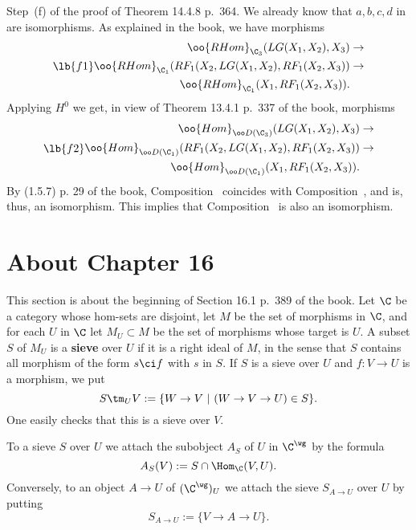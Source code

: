 \documentclass[12pt]{article}
\theoremstyle{remark}
\theoremstyle{definition}
\begin{document}
\begin{s}
Step~(f) of the proof of Theorem 14.4.8 p.~364. We already know that $a,b,c,d$ in  are isomorphisms. As explained in the book, we have morphisms  
\begin{equation}\lb{f1}
\begin{split}
\oo{RHom}_{\C_3}(LG(X_1,X_2),X_3)&\to\\ 
\oo{RHom}_{\C_1}(RF_1(X_2,LG(X_1,X_2),RF_1(X_2,X_3))&\to\\ 
\oo{RHom}_{\C_1}(X_1,RF_1(X_2,X_3)).
\end{split}
\end{equation}
Applying $H^0$ we get, in view of Theorem 13.4.1 p.~337 of the book, morphisms 
\begin{equation}\lb{f2}
\begin{split}
\oo{Hom}_{\oo D(\C_3)}(LG(X_1,X_2),X_3)&\to\\ 
\oo{Hom}_{\oo D(\C_1)}(RF_1(X_2,LG(X_1,X_2),RF_1(X_2,X_3))&\to\\ 
\oo{Hom}_{\oo D(\C_1)}(X_1,RF_1(X_2,X_3)).
\end{split}
\end{equation}
By (1.5.7) p. 29 of the book, Composition~ coincides with Composition~, and is, thus, an isomorphism. This implies that Composition~ is also an isomorphism.
\end{s}


\section{About Chapter 16}


This section is about the beginning of Section 16.1 p.~389 of the book. Let $\C$ be a category whose hom-sets are disjoint, let $M$ be the set of morphisms in $\C$, and for each $U$ in $\C$ let $M_U\subset M$ be the set of morphisms whose target is $U$. A subset $S$ of $M_U$ is a \textbf{sieve}  over $U$ if it is a right ideal of $M$, in the sense that $S$ contains all morphism of the form $s\ci f$ with $s$ in $S$. If $S$ is a sieve over $U$ and $f:V\to U$ is a morphism, we put
$$
S\tm_UV:=\{W\to V\ |\ (W\to V\to U)\in S\}.
$$
One easily checks that this is a sieve over $V$. 

To a sieve $S$ over $U$ we attach the subobject $A_S$ of $U$ in $\C^\wg$ by the formula
$$
A_S(V):=S\cap\Hom_\C(V,U).
$$ 
Conversely, to an object $A\to U$ of $(\C^\wg)_U$ we attach the sieve $S_{A\to U}$ over $U$ by putting 
$$
S_{A\to U}:=\{V\to A\to U\}.
$$ 
\end{document}
